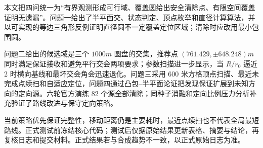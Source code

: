 本文把四问统一为“有界观测形成可行域、覆盖圆给出安全清除点、有限空间覆盖证明无遗漏”。问题一给出了半平面交、状态判定、顶点枚举和直径计算算法，并以可实现的等边三角形反例证明直径圆不一定覆盖定位区域；清除时应改用最小包围圆。

问题二给出的候选域是三个 $1000\unit{m}$ 圆盘的交集，推荐点
$(761.429,\pm648.248)\unit{m}$ 同时满足保证接收和避免平行交会两项要求；参数扫描进一步显示，当 $R/r_0$ 逼近 2 时横向基线和最坏交会角会迅速退化。问题三采用 600 米方格顶点扫描、最近未完成点续扫和自适应定位，问题四通过凸包--半平面论证把发现保证扩展到未知方向的定向源。六轮官方演练 82 个源全部清除；同种子消融和定向比例压力分析补充验证了路线改进与保守定向策略。

当前策略优先保证完整性，移动距离仍是主要耗时，最近点续扫也不代表全局最短路线。正式测试前冻结核心代码；测试后仅据原始结果更新表格、摘要与结论，再复核日志和提交材料。正式结果若与合成趋势不一致，以正式原始日志为准。
